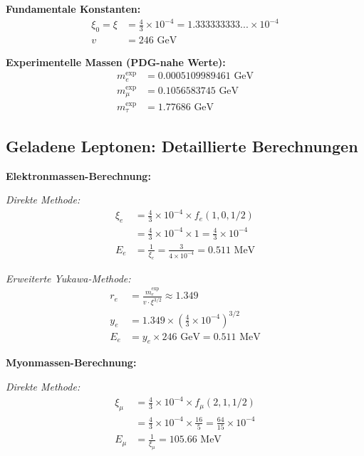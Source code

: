 \documentclass[12pt,a4paper]{article}
\begin{document}
	\textbf{Fundamentale Konstanten:}
	\begin{align}
		\xi_0 = \xi &= \frac{4}{3} \times 10^{-4} = 1.333333333... \times 10^{-4} \\
		v &= 246 \text{ GeV}
	\end{align}
	
	\textbf{Experimentelle Massen (PDG-nahe Werte):}
	\begin{align}
		m_e^{\text{exp}} &= 0.0005109989461 \text{ GeV} \\
		m_\mu^{\text{exp}} &= 0.1056583745 \text{ GeV} \\
		m_\tau^{\text{exp}} &= 1.77686 \text{ GeV}
	\end{align}
	
	\subsection{Geladene Leptonen: Detaillierte Berechnungen}
	\label{subsec:charged_leptons_detailed}
	
	\textbf{Elektronmassen-Berechnung:}
	
	\textit{Direkte Methode:}
	\begin{align}
		\xi_e &= \frac{4}{3} \times 10^{-4} \times f_e(1,0,1/2) \\
		&= \frac{4}{3} \times 10^{-4} \times 1 = \frac{4}{3} \times 10^{-4} \\
		E_{e} &= \frac{1}{\xi_e} = \frac{3}{4 \times 10^{-4}} = 0.511 \text{ MeV}
	\end{align}
	
	\textit{Erweiterte Yukawa-Methode:}
	\begin{align}
		r_e &= \frac{m_e^{\text{exp}}}{v \cdot \xi^{3/2}} \approx 1.349 \\
		y_e &= 1.349 \times \left(\frac{4}{3} \times 10^{-4}\right)^{3/2} \\
		E_e &= y_e \times 246 \text{ GeV} = 0.511 \text{ MeV}
	\end{align}
	
	\textbf{Myonmassen-Berechnung:}
	
	\textit{Direkte Methode:}
	\begin{align}
		\xi_\mu &= \frac{4}{3} \times 10^{-4} \times f_\mu(2,1,1/2) \\
		&= \frac{4}{3} \times 10^{-4} \times \frac{16}{5} = \frac{64}{15} \times 10^{-4} \\
		E_{\mu} &= \frac{1}{\xi_\mu} = 105.66 \text{ MeV}
	\end{align}
	
\end{document}
